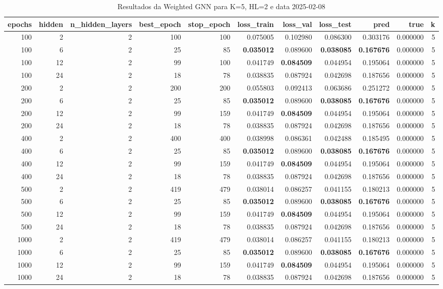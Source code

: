 \begin{table}
\caption{Resultados da Weighted GNN para K=5, HL=2 e data 2025-02-08}
\label{tab:weighted_gnn_results_k5_hl2_d20250208}
\begin{tabular}{rrrrrrrrrrr}
\toprule
epochs & hidden & n\_hidden\_layers & best\_epoch & stop\_epoch & loss\_train & loss\_val & loss\_test & pred & true & k \\
\midrule
100 & 2 & 2 & 100 & 100 & 0.075005 & 0.102980 & 0.086300 & 0.303176 & 0.000000 & 5 \\
100 & 6 & 2 & 25 & 85 & \textbf{0.035012} & 0.089600 & \textbf{0.038085} & \textbf{0.167676} & 0.000000 & 5 \\
100 & 12 & 2 & 99 & 100 & 0.041749 & \textbf{0.084509} & 0.044954 & 0.195064 & 0.000000 & 5 \\
100 & 24 & 2 & 18 & 78 & 0.038835 & 0.087924 & 0.042698 & 0.187656 & 0.000000 & 5 \\
200 & 2 & 2 & 200 & 200 & 0.055803 & 0.092413 & 0.063686 & 0.251272 & 0.000000 & 5 \\
200 & 6 & 2 & 25 & 85 & \textbf{0.035012} & 0.089600 & \textbf{0.038085} & \textbf{0.167676} & 0.000000 & 5 \\
200 & 12 & 2 & 99 & 159 & 0.041749 & \textbf{0.084509} & 0.044954 & 0.195064 & 0.000000 & 5 \\
200 & 24 & 2 & 18 & 78 & 0.038835 & 0.087924 & 0.042698 & 0.187656 & 0.000000 & 5 \\
400 & 2 & 2 & 400 & 400 & 0.038998 & 0.086361 & 0.042488 & 0.185495 & 0.000000 & 5 \\
400 & 6 & 2 & 25 & 85 & \textbf{0.035012} & 0.089600 & \textbf{0.038085} & \textbf{0.167676} & 0.000000 & 5 \\
400 & 12 & 2 & 99 & 159 & 0.041749 & \textbf{0.084509} & 0.044954 & 0.195064 & 0.000000 & 5 \\
400 & 24 & 2 & 18 & 78 & 0.038835 & 0.087924 & 0.042698 & 0.187656 & 0.000000 & 5 \\
500 & 2 & 2 & 419 & 479 & 0.038014 & 0.086257 & 0.041155 & 0.180213 & 0.000000 & 5 \\
500 & 6 & 2 & 25 & 85 & \textbf{0.035012} & 0.089600 & \textbf{0.038085} & \textbf{0.167676} & 0.000000 & 5 \\
500 & 12 & 2 & 99 & 159 & 0.041749 & \textbf{0.084509} & 0.044954 & 0.195064 & 0.000000 & 5 \\
500 & 24 & 2 & 18 & 78 & 0.038835 & 0.087924 & 0.042698 & 0.187656 & 0.000000 & 5 \\
1000 & 2 & 2 & 419 & 479 & 0.038014 & 0.086257 & 0.041155 & 0.180213 & 0.000000 & 5 \\
1000 & 6 & 2 & 25 & 85 & \textbf{0.035012} & 0.089600 & \textbf{0.038085} & \textbf{0.167676} & 0.000000 & 5 \\
1000 & 12 & 2 & 99 & 159 & 0.041749 & \textbf{0.084509} & 0.044954 & 0.195064 & 0.000000 & 5 \\
1000 & 24 & 2 & 18 & 78 & 0.038835 & 0.087924 & 0.042698 & 0.187656 & 0.000000 & 5 \\
\bottomrule
\end{tabular}
\end{table}

